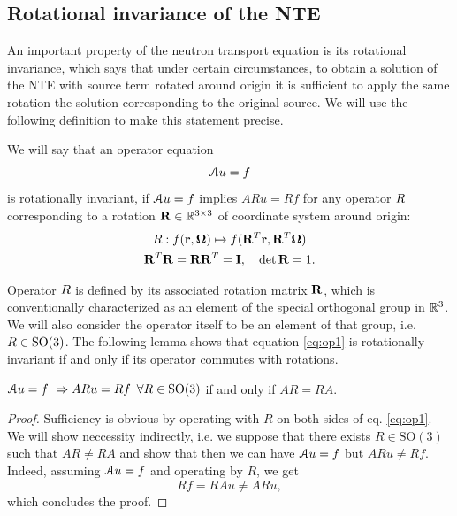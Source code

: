 \subsection{Rotational invariance of the NTE}\label{sec:rotinv}
An important property of the neutron transport equation is its rotational invariance, which says that under certain
circumstances, to obtain a solution of the NTE with source term rotated around origin it is sufficient to apply the same
rotation the solution corresponding to the original source. We will use the following definition to make this
statement precise.
 
\begin{definition}
We will say that an
operator equation
\begin{equation}\label{eq:op1} 
\genop{A}u = f
\end{equation}
is rotationally invariant, if $\genop{A}u = f$ implies $ARu = Rf$ for any operator
$\op{R}$ corresponding to a rotation $\mat{R}\in\R[3\times3]$ of coordinate system around origin:
\begin{equation}\label{eq:def_rot}
\begin{gathered}
\op{R}: f(\br,\bomega) \mapsto f(\mat{R}^T\br,\mat{R}^T\bomega)\\
\mat{R}^T\mat{R} = \mat{R}\mat{R}^T = \mat{I},\quad \det \mat{R} = 1.
\end{gathered}
\end{equation}
\end{definition}
Operator $\op{R}$ is defined by its associated rotation matrix $\mat{R}$, which is conventionally
characterized as an element of the special orthogonal group in $\R[3]$. We will also
consider the operator itself to be an element of that group, i.e.
$\op{R} \in \mathrm{SO}(3)$. The following lemma shows that equation \eqref{eq:op1} is rotationally invariant if and
only if its operator commutes with rotations.
\begin{lemma}\label{lemma1}
	$\genop{A}u = f \ \Rightarrow ARu = Rf\,\ \forall R\in \mathrm{SO}(3)$ if and only if $AR = RA$.
\end{lemma}
\begin{proof}
	Sufficiency is obvious by operating with $R$ on both sides of eq. \eqref{eq:op1}.
	We will show neccessity indirectly, i.e. we suppose that there exists $R\in\mathrm{SO}(3)$ such that $AR \neq RA$
	and show that then we can have $\genop{A}u = f$ but $ARu \neq Rf$. Indeed, assuming $\genop{A}u = f$ and operating by $R$, we get  
	$$
		Rf = RAu \neq ARu,
	$$
	which concludes the proof.
\end{proof}

